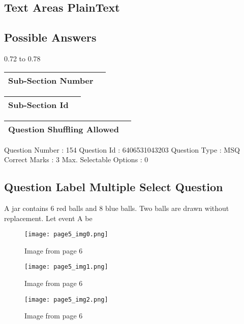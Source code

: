 \documentclass{article}
\begin{document}
\subsection{Text Areas  PlainText}

\subsection{Possible Answers }

0.72 to 0.78\\

\begin{longtable}{|c|c|}
\hline
\textbf{Sub-Section Number} & \textbf{} \\ \hline
\end{longtable}

\begin{longtable}{|c|c|}
\hline
\textbf{Sub-Section Id} & \textbf{} \\ \hline
\end{longtable}

\begin{longtable}{|c|c|}
\hline
\textbf{Question Shuffling Allowed} & \textbf{} \\ \hline
\end{longtable}

Question Number : 154 Question Id : 6406531043203 Question Type : MSQ\\

Correct Marks : 3 Max. Selectable Options : 0\\

\subsection{Question Label  Multiple Select Question}

A jar contains 6 red balls and 8 blue balls. Two balls are drawn without replacement. Let event A be\\

\newpage
\begin{figure}[h]
\centering
\texttt{[image: page5\_img0.png]}
\caption{Image from page 6}
\end{figure}

\begin{figure}[h]
\centering
\texttt{[image: page5\_img1.png]}
\caption{Image from page 6}
\end{figure}

\begin{figure}[h]
\centering
\texttt{[image: page5\_img2.png]}
\caption{Image from page 6}
\end{figure}
\end{document}
